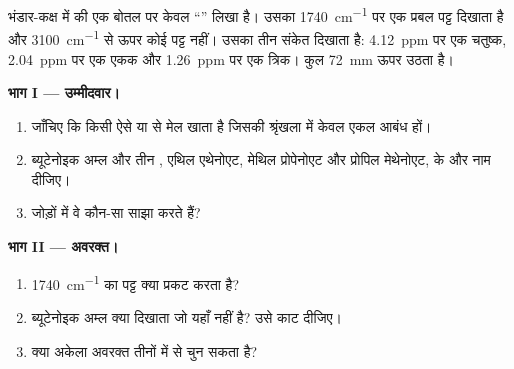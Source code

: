 \begin{problem}
\label{pb:g12:proton-nmr:1}
भंडार-कक्ष में  की एक बोतल पर केवल ``'' लिखा है। उसका
 \qty{1740}{cm^{-1}} पर एक प्रबल पट्ट दिखाता है और
\qty{3100}{cm^{-1}} से ऊपर कोई पट्ट नहीं। उसका  तीन संकेत दिखाता है:
\qty{4.12}{ppm} पर एक चतुष्क, \qty{2.04}{ppm} पर एक एकक और
\qty{1.26}{ppm} पर एक त्रिक।  कुल \qty{72}{mm} ऊपर उठता है।

\medskip
\noindent\textbf{भाग I --- उम्मीदवार।}
\begin{enumerate}
  \item जाँचिए कि  किसी ऐसे  या  से मेल खाता है
        जिसकी श्रृंखला में केवल एकल आबंध हों।
  \item ब्यूटेनोइक अम्ल और तीन , एथिल एथेनोएट, मेथिल प्रोपेनोएट और प्रोपिल
        मेथेनोएट, के  और नाम दीजिए।
  \item जोड़ों में वे कौन-सा  साझा करते हैं?
\end{enumerate}

\medskip
\noindent\textbf{भाग II --- अवरक्त।}
\begin{enumerate}[resume]
  \item \qty{1740}{cm^{-1}} का पट्ट क्या प्रकट करता है?
  \item ब्यूटेनोइक अम्ल क्या दिखाता जो यहाँ नहीं है? उसे काट
        दीजिए।
  \item क्या अकेला अवरक्त तीनों  में से चुन सकता है?
\end{enumerate}


\end{problem}
